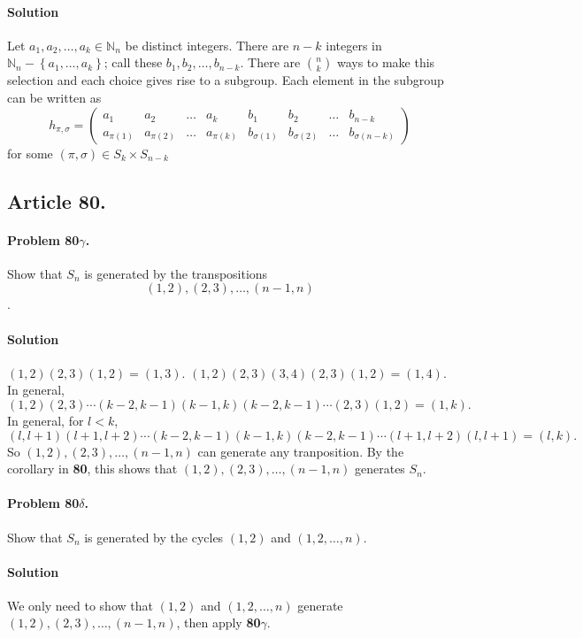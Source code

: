 \paragraph*{Solution}
Let $a_1, a_2, \dots , a_k \in \mathbb{N}_n$ be distinct integers. There are
$n-k$ integers in $\mathbb{N}_n - \left\{a_1, \dots , a_k\right\}$; call these
$b_1, b_2, \dots , b_{n-k}$. There are $\binom{n}{k}$ ways to make this selection
and each choice gives rise to a subgroup. Each element in the subgroup can be
written as
$$
h_{\pi, \sigma} =
\left(
\begin{array}{cccccccc}
a_1        & a_2        & \dots & a_k        & b_1           & b_2           & \dots & b_{n-k} \\
a_{\pi(1)} & a_{\pi(2)} & \dots & a_{\pi(k)} & b_{\sigma(1)} & b_{\sigma(2)} & \dots & b_{\sigma(n-k)}
\end{array}
\right)
$$
for some $(\pi, \sigma) \in S_k \times S_{n-k}$

\subsection{Article 80.}

\paragraph{Problem 80$\gamma$.}
Show that $S_n$ is generated by the transpositions $$(1,2), (2,3), \dots, (n-1,n)$$.

\paragraph*{Solution}
$(1,2)(2,3)(1,2) = (1,3)$.
$(1,2)(2,3)(3,4)(2,3)(1,2) = (1,4)$.
In general, $$(1,2)(2,3) \cdots (k-2,k-1)(k-1,k)(k-2,k-1) \cdots (2,3)(1,2) = (1,k).$$
In general, for $l < k$,
$$(l,l+1)(l+1,l+2) \cdots (k-2,k-1)(k-1,k)(k-2,k-1) \cdots (l+1,l+2)(l,l+1) = (l,k).$$
So $(1,2), (2,3), \dots, (n-1,n)$ can generate any tranposition. By the corollary
in \textbf{80}, this shows that $(1,2), (2,3), \dots, (n-1,n)$ generates $S_n$.

\paragraph{Problem 80$\delta$.}
Show that $S_n$ is generated by the cycles $(1,2)$ and $(1,2, \dots, n)$.

\paragraph*{Solution}
We only need to show that $(1,2)$ and $(1,2, \dots, n)$ generate
$(1,2), (2,3), \dots, (n-1,n)$, then apply \textbf{80$\gamma$}.

